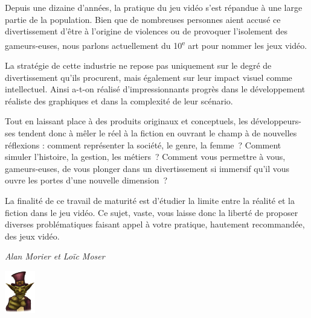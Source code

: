 \documentclass[
  10pt,
  french,
  a5paper,
  openany]{book}
\newenvironment{signature}{\begin{flushright}}{\end{flushright}}
\begin{document}

Depuis une dizaine d'années, la pratique du jeu vidéo s'est répandue à une large partie de la population. Bien que de nombreuses personnes aient accusé ce divertissement d'être à l'origine de violences ou de provoquer l'isolement des gameurs-euses, nous parlons actuellement du 10\textsuperscript{e} art pour nommer les jeux vidéo.

La stratégie de cette industrie ne repose pas uniquement sur le degré de divertissement qu'ils procurent, mais également sur leur impact visuel comme intellectuel. Ainsi a-t-on réalisé d'impressionnants progrès dans le développement réaliste des graphiques et dans la complexité de leur scénario.

Tout en laissant place à des produits originaux et conceptuels, les développeurs-ses tendent donc à mêler le réel à la fiction en ouvrant le champ à de nouvelles réflexions : comment représenter la société, le genre, la femme~? Comment simuler l'histoire, la gestion, les métiers~? Comment vous permettre à vous, gameurs-euses, de vous plonger dans un divertissement si immersif qu'il vous ouvre les portes d'une nouvelle dimension~?

\clearpage

La finalité de ce travail de maturité est d'étudier la limite entre la réalité et la fiction dans le jeu vidéo. Ce sujet, vaste, vous laisse donc la liberté de proposer diverses problématiques faisant appel à votre pratique, hautement recommandée, des jeux vidéo.

\begin{signature}
\emph{Alan Morier et Loïc Moser}

\end{signature}

\begin{flushright}
\includegraphics[width=\textwidth,height=5em]{images/le-jeu-video-fiction-ou-realite-2.jpg}

\end{flushright}
\end{document}
